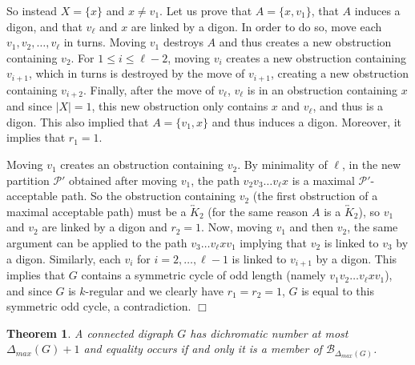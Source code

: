 \documentclass[11pt]{article}
\newtheorem{theorem}[lemma]{Theorem}
\newcommand{\mc}{\mathcal}
\newcommand{\dmax}{\Delta_{max}}
\newcounter{claim}
\newenvironment{proof}[1][]%
 {\noindent {\setcounter{claim}{0}\sc proof ---
   }{#1}{}}{\hfill$\Box$\vspace{2ex}}
\begin{document}
\begin{proof}
So instead $X = \{x\}$ and $x \neq v_1$. 
Let us prove that $A = \{x,v_1\}$, that $A$ induces a digon, and that $v_{\ell}$ and $x$ are linked by a digon.  
In order to do so, move each $v_1, v_2, \dots, v_{\ell}$ in turns.  
Moving $v_1$ destroys  $A$ and thus  creates a new obstruction containing $v_2$.  
For $1 \leq i \leq \ell-2$, moving $v_i$ creates a new obstruction containing $v_{i+1}$, which in turns is destroyed by the move of $v_{i+1}$, creating a new obstruction containing $v_{i+2}$. %
Finally, after the move of $v_{\ell}$, $v_{\ell}$ is in an obstruction containing $x$ and  since $|X| = 1$, this new obstruction only contains $x$ and $v_{\ell}$, and thus is a digon. This also implied that $A = \{v_1, x\}$ and thus induces a digon. Moreover, it implies that $r_1 = 1$.   

Moving $v_1$ creates an obstruction containing $v_2$. By minimality of $\ell$, in the new partition $\mc P'$ obtained after moving $v_1$, the path $v_2v_3 \dots v_{\ell}x$ is a maximal $\mc P'$-acceptable path. 
So the obstruction containing $v_2$ (the first obstruction of a maximal acceptable path) must be a $\overleftrightarrow K_2$ (for the same reason $A$ is a $\overleftrightarrow K_2$), so $v_1$ and $v_2$ are linked by a digon and $r_2 = 1$. %
Now, moving $v_1$ and then $v_2$, the same argument can be applied to the path $v_3 \dots v_{\ell}xv_1$ implying that $v_2$ is linked to $v_3$ by a digon. %
Similarly, each $v_i$ for $i=2, \dots, \ell-1$ %
is linked to $v_{i+1}$ by a digon. 
This implies that $G$ contains a symmetric cycle of odd length (namely $v_1v_2 \dots v_{\ell}xv_1$), and since $G$ is $k$-regular and we clearly have $r_1 = r_2 =1$, $G$ is equal to this symmetric odd cycle, a contradiction. 
\end{proof}

\begin{theorem}
A connected digraph $G$ has dichromatic number at most $\dmax(G) +1$ and equality occurs if and only it is a member of $\mc B_{\dmax(G)}$. 
\end{theorem}
\end{document}
